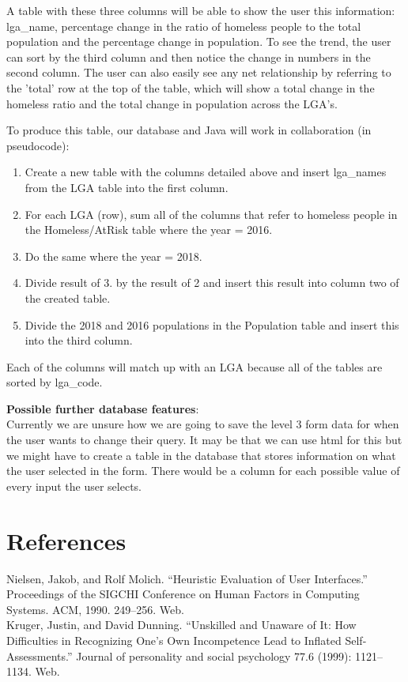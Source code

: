 \documentclass[12pt, a4paper]{article}
\begin{document}
A table with these three columns will be able to show the user this information: lga\_name, percentage change in the ratio of homeless people to the total population and the percentage change in population. To see the trend, the user can sort by the third column and then notice the change in numbers in the second column. The user can also easily see any net relationship by referring to the 'total' row at the top of the table, which will show a total change in the homeless ratio and the total change in population across the LGA's. 

To produce this table, our database and Java will work in collaboration (in pseudocode):
\begin{enumerate}
\item Create a new table with the columns detailed above and insert lga\_names from the LGA table into the first column.
\item For each LGA (row), sum all of the columns that refer to homeless people in the Homeless/AtRisk table where the year = 2016.
\item Do the same where the year = 2018.
\item Divide result of 3. by the result of 2 and insert this result into column two of the created table.
\item Divide the 2018 and 2016 populations in the Population table and insert this into the third column.
\end{enumerate}
Each of the columns will match up with an LGA because all of the tables are sorted by lga\_code. 

\textbf{Possible further database features}: \\
Currently we are unsure how we are going to save the level 3 form data for when the user wants to change their query. It may be that we can use html for this but we might have to create a table in the database that stores information on what the user selected in the form. There would be a column for each possible value of every input the user selects. \\

\section{References}

Nielsen, Jakob, and Rolf Molich. “Heuristic Evaluation of User Interfaces.” Proceedings of the SIGCHI Conference on Human Factors in Computing Systems. ACM, 1990. 249–256. Web. \\

Kruger, Justin, and David Dunning. “Unskilled and Unaware of It: How Difficulties in Recognizing One’s Own Incompetence Lead to Inflated Self-Assessments.” Journal of personality and social psychology 77.6 (1999): 1121–1134. Web.
\end{document}
